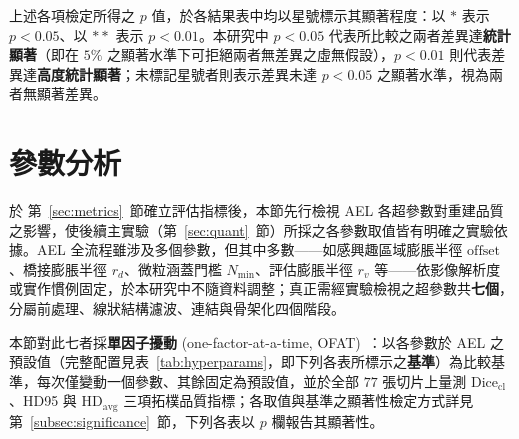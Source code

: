 \noindent 上述各項檢定所得之 $p$ 值，於各結果表中均以星號標示其顯著程度：以 $*$ 表示 $p < 0.05$、以 $**$ 表示 $p < 0.01$。本研究中 $p < 0.05$ 代表所比較之兩者差異達\textbf{統計顯著}（即在 $5\%$ 之顯著水準下可拒絕兩者無差異之虛無假設），$p < 0.01$ 則代表差異達\textbf{高度統計顯著}；未標記星號者則表示差異未達 $p < 0.05$ 之顯著水準，視為兩者無顯著差異。

\section{參數分析}
\label{sec:param-analysis}

於 第~\ref{sec:metrics}~節確立評估指標後，本節先行檢視 AEL 各超參數對重建品質之影響，使後續主實驗（第~\ref{sec:quant}~節）所採之各參數取值皆有明確之實驗依據。AEL 全流程雖涉及多個參數，但其中多數——如感興趣區域膨脹半徑 $\text{offset}$、橋接膨脹半徑 $r_d$、微粒涵蓋門檻 $N_{\min}$、評估膨脹半徑 $r_v$ 等——依影像解析度或實作慣例固定，於本研究中不隨資料調整；真正需經實驗檢視之超參數共\textbf{七個}，分屬前處理、線狀結構濾波、連結與骨架化四個階段。

本節對此七者採\textbf{單因子擾動} (one-factor-at-a-time, OFAT)~\cite{saltelli2008global}：以各參數於 AEL 之預設值（完整配置見表~\ref{tab:hyperparams}，即下列各表所標示之\textbf{基準}）為比較基準，每次僅變動一個參數、其餘固定為預設值，並於全部 $77$ 張切片上量測 $\text{Dice}_{\text{cl}}$、HD95 與 $\text{HD}_{\text{avg}}$ 三項拓樸品質指標；各取值與基準之顯著性檢定方式詳見第~\ref{subsec:significance}~節，下列各表以 $p$ 欄報告其顯著性。

